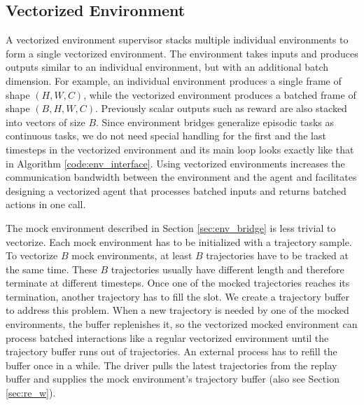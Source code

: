\subsection{Vectorized Environment} \label{sec:vec_env}
A vectorized environment supervisor stacks multiple individual environments to form a single vectorized environment.
The environment takes inputs and produces outputs similar to an individual environment, but with an additional batch dimension.
For example, an individual environment produces a single frame of shape $(H, W, C)$, while the vectorized environment produces a batched frame of shape $(B, H, W, C)$.
Previously scalar outputs such as reward are also stacked into vectors of size $B$.
Since environment bridges generalize episodic tasks as continuous tasks, we do not need special handling for the first and the last timesteps in the vectorized environment and its main loop looks exactly like that in Algorithm \ref{code:env_interface}.
Using vectorized environments increases the communication bandwidth between the environment and the agent and facilitates designing a vectorized agent that processes batched inputs and returns batched actions in one call.

The mock environment described in Section \ref{sec:env_bridge} is less trivial to vectorize.
Each mock environment has to be initialized with a trajectory sample.
To vectorize $B$ mock environments, at least $B$ trajectories have to be tracked at the same time.
These $B$ trajectories usually have different length and therefore terminate at different timesteps.
Once one of the mocked trajectories reaches its termination, another trajectory has to fill the slot.
We create a trajectory buffer to address this problem.
When a new trajectory is needed by one of the mocked environments, the buffer replenishes it,
so the vectorized mocked environment can process batched interactions like a regular vectorized environment until the trajectory buffer runs out of trajectories.
An external process has to refill the buffer once in a while.
The driver pulls the latest trajectories from the replay buffer and supplies the mock environment's trajectory buffer (also see Section \ref{sec:re_w}).


